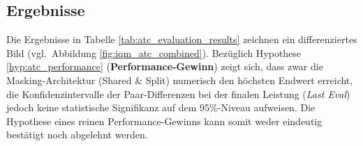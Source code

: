 \subsection{Ergebnisse}

\begin{table}[htbp]
    \centering
    \caption{Vergleich der Trainingsergebnisse in der Flugverkehrsumgebung (\ac{IQM} mit 95\%\hyp{}Konfidenzintervall)}
    \label{tab:atc_evaluation_results}
\end{table}

Die Ergebnisse in Tabelle \ref{tab:atc_evaluation_results} zeichnen ein differenziertes Bild (vgl.~Abbildung \ref{fig:iqm_atc_combined}).
Bezüglich Hypothese \ref{hyp:atc_performance} (\textbf{Performance-Gewinn}) zeigt sich, dass zwar die Masking-Architektur (Shared \& Split) numerisch den höchsten Endwert erreicht, die Konfidenzintervalle der Paar-Differenzen bei der finalen Leistung (\emph{Last Eval}) jedoch keine statistische Signifikanz auf dem 95\%-Niveau aufweisen. Die Hypothese eines reinen Performance-Gewinns kann somit weder eindeutig bestätigt noch abgelehnt werden.

